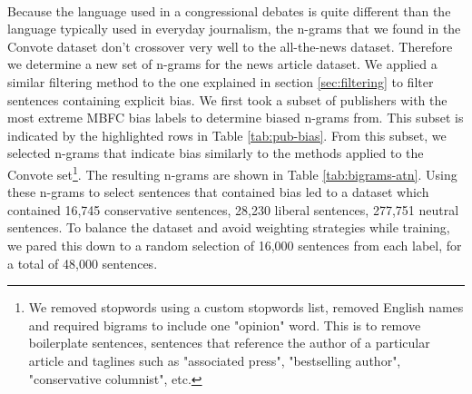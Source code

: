 \documentclass[10pt,a4paper,onecolumn]{article}
\begin{document}
\paragraph{}
Because the language used in a congressional debates is quite different than the language typically used in everyday journalism, the n-grams that we found in the Convote dataset don't crossover very well to the all-the-news dataset. Therefore we determine a new set of n-grams for the news article dataset. We applied a similar filtering method to the one explained in section \ref{sec:filtering} to filter sentences containing explicit bias. We first took a subset of publishers with the most extreme MBFC bias labels to determine biased n-grams from. This subset is indicated by the highlighted rows in Table \ref{tab:pub-bias}. From this subset, we selected n-grams that indicate bias similarly to the methods applied to the Convote set\footnote{We removed stopwords using a custom stopwords list, removed English names and required bigrams to include one "opinion" word. This is to remove boilerplate sentences, sentences that reference the author of a particular article and taglines such as "associated press", "bestselling author", "conservative columnist", etc.}. The resulting n-grams are shown in Table \ref{tab:bigrams-atn}. Using these n-grams to select sentences that contained bias led to a dataset which contained 16,745 conservative sentences, 28,230 liberal sentences, 277,751 neutral sentences. To balance the dataset and avoid weighting strategies while training, we pared this down to a random selection of 16,000 sentences from each label, for a total of 48,000 sentences. 
\end{document}
